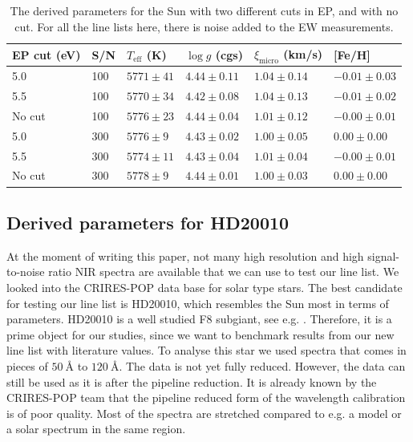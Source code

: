 \documentclass{aa}
\begin{document}
\begin{table}[tb!]
    \caption{The derived parameters for the Sun with two different cuts
    in EP, and with no cut. For all the line lists here, there is noise
    added to the EW measurements.}
    \label{tab:sun}
    \centering
    \begin{tabular}{llllll}
      \hline\hline
        EP cut (eV) &  S/N &  $T_\mathrm{eff}$ (K) &  $\log g$ (cgs)     &  $\xi_\mathrm{micro}$ (km/s) &  [Fe/H]           \\
        \hline
        5.0         &  100 &  $5771 \pm  41$       & $4.44   \pm  0.11$  & $1.04  \pm  0.14$            & $-0.01    \pm 0.03$\\
        5.5         &  100 &  $5770 \pm  34$       & $4.42   \pm  0.08$  & $1.04  \pm  0.13$            & $-0.01    \pm 0.02$\\
        No cut      &  100 &  $5776 \pm  23$       & $4.44   \pm  0.04$  & $1.01  \pm  0.12$            & $-0.00    \pm 0.01$\\
        \hline
        5.0         &  300 &  $5776 \pm  9 $       & $4.43   \pm  0.02$  & $1.00  \pm  0.05$            &  $0.00    \pm 0.00$\\
        5.5         &  300 &  $5774 \pm  11$       & $4.43   \pm  0.04$  & $1.01  \pm  0.04$            & $-0.00    \pm 0.01$\\
        No cut      &  300 &  $5778 \pm  9 $       & $4.44   \pm  0.01$  & $1.00  \pm  0.03$            &  $0.00    \pm 0.00$\\
      \hline
    \end{tabular}
\end{table}




\subsection{Derived parameters for HD20010}
\label{sec:derived_parameters_of_hd20010}

At the moment of writing this paper, not many high resolution and
high signal-to-noise ratio NIR spectra are available that we can
use to test our line list. We looked into the CRIRES-POP data base
\citep{Lebzelter2012} for solar type stars. The best candidate for
testing our line list is HD20010, which resembles the Sun most in
terms of parameters. HD20010 is a well studied F8 subgiant, see e.g.
\cite{Mortier2013,Lebzelter2012}. Therefore, it is a prime object for
our studies, since we want to benchmark results from our new line list
with literature values. To analyse this star we used spectra that comes
in pieces of $\SI{50}{\angstrom}$ to $\SI{120}{\angstrom}$. The data
is not yet fully reduced. However, the data can still be used as it is
after the pipeline reduction. It is already known by the CRIRES-POP team
that the pipeline reduced form of the wavelength calibration is of poor
quality. Most of the spectra are stretched compared to e.g. a model or a
solar spectrum in the same region.
\end{document}
